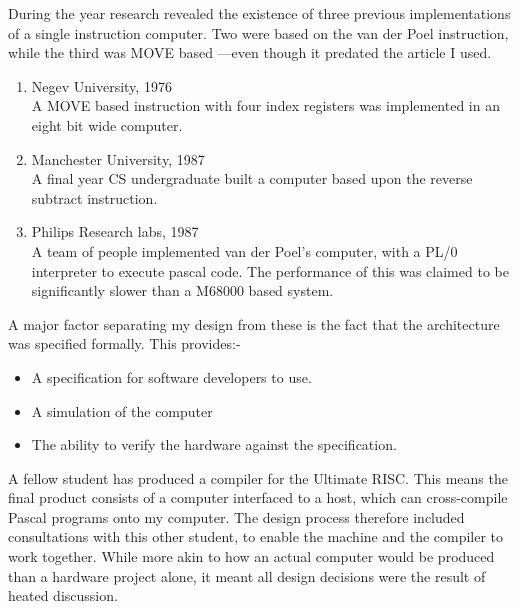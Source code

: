 {\samepage
During the year  research  revealed the existence of three previous implementations of a single instruction computer. Two were based on the van der Poel instruction, while the third was MOVE based ---even though it predated the article I used.
\begin{enumerate}

\item Negev University, 1976 \cite{tabak:risc}\\
		A MOVE based instruction with four index registers was
		implemented in an eight bit wide computer.

\item Manchester University, 1987\\
		A final year CS undergraduate built a computer based upon
		the reverse subtract instruction. 

\item Philips Research labs, 1987 \cite{slav:oisc}\\
		A team of people implemented van der Poel's  computer, 
		with a PL/0 interpreter to execute pascal code.
		 The performance of this was claimed to be significantly slower 
		 than a M68000 based system.

\end{enumerate}
}

A major factor separating my design from these is the fact that 
the architecture was specified formally. This provides:-
\begin{itemize}
\item
A specification for software developers to use.
\item
A  simulation of the computer
\item
The ability to verify the hardware against the specification.
\end{itemize}
A fellow student has produced a compiler for the 
Ultimate RISC. 
This means the final product  consists of a 
computer interfaced to a host, which can cross-compile Pascal programs 
 onto my computer.  The design process therefore included 
 consultations with this other student, to enable 
the machine and the compiler to work together. 
While more akin to 
how an actual computer would be produced than a hardware project 
alone, it  meant  all design decisions were  the result of 
heated  discussion. 
